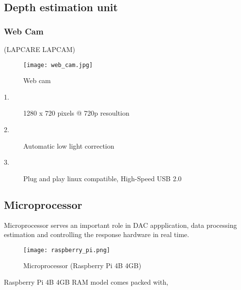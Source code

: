 \documentclass[../../../patent_v1.tex]{subfiles}
\begin{document}
\subsection{Depth estimation unit}

\subsubsection{Web Cam}

(LAPCARE LAPCAM)

\begin{figure}[ht]
    \centering
    \texttt{[image: web\_cam.jpg]}
    \caption{Web cam}
\end{figure}

\FloatBarrier

\begin{description}
    \item[1.]1280 x 720 pixels @ 720p resoultion
    \item[2.]Automatic low light correction
    \item[3.]Plug and play linux compatible, High-Speed USB 2.0   
\end{description}


\subsection{Microprocessor}

Microprocessor serves an important role in DAC appplication, data processing estimation 
and controlling the response hardware in real time.

\begin{figure}[ht]
    \texttt{[image: raspberry\_pi.png]}
    \caption{Microprocessor (Raspberry Pi 4B 4GB)}
\end{figure}

\FloatBarrier

Raspberry Pi 4B 4GB RAM model comes packed with, 
\end{document}
